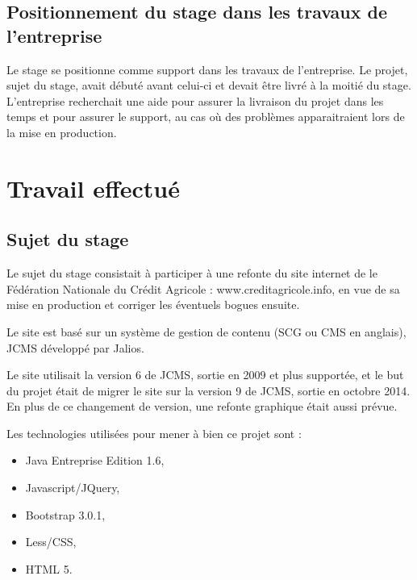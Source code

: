 \documentclass[12pt,a4paper]{article}
\begin{document}
\subsection{Positionnement du stage dans les travaux de l'entreprise}
Le stage se positionne comme support dans les travaux de l'entreprise. Le projet, sujet du stage, avait débuté avant celui-ci et devait être livré à la moitié du stage. L'entreprise recherchait une aide pour assurer la livraison du projet dans les temps et pour assurer le support, au cas où des problèmes apparaitraient lors de la mise en production.

\newpage

\section{Travail effectué}
\subsection{Sujet du stage}
Le sujet du stage consistait à participer à une refonte du site internet de le Fédération Nationale du Crédit Agricole : www.creditagricole.info, en vue de sa mise en production et corriger les éventuels bogues ensuite.\par
Le site est basé sur un système de gestion de contenu (SCG ou CMS en anglais), \gls{JCMS} développé par Jalios.\par
Le site utilisait la version 6 de \gls{JCMS}, sortie en 2009 et plus supportée, et le but du projet était de migrer le site sur la version 9 de \gls{JCMS}, sortie en octobre 2014. En plus de ce changement de version, une refonte graphique était aussi prévue.\par
Les technologies utilisées pour mener à bien ce projet sont :
\begin{itemize}
\item Java Entreprise Edition 1.6,
\item Javascript/JQuery,
\item Bootstrap 3.0.1,
\item Less/\gls{CSS},
\item \gls{HTML} 5.
\end{itemize}
\end{document}
